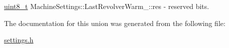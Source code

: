 \mbox{\label{unionMachineSettings_1_1LastRevolverWarm___a4c650f2a502f1289b07ef0003fd5125a}} 
{\footnotesize\ttfamily \mbox{\hyperlink{settings_8h_a48091a1e52849b0871df2f7081be2e38}{uint8\+\_\+t}} Machine\+Settings\+::\+Last\+Revolver\+Warm\+\_\+\+::\texorpdfstring{res}{res}} - reserved bits.


The documentation for this union was generated from the following file\+:\begin{DoxyCompactItemize}
\item 
\mbox{\hyperlink{settings_8h}{settings.\+h}}\end{DoxyCompactItemize}
\newpage